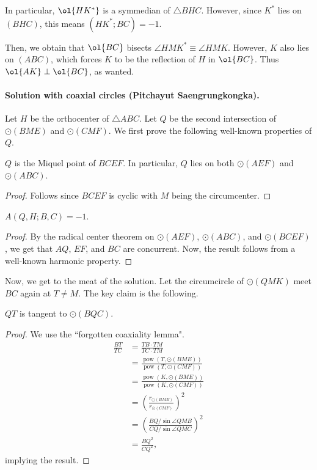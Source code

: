 \documentclass[11pt]{scrartcl}
\begin{document}
In particular, $\ol{HK^\ast}$ is a symmedian of $\triangle BHC$.
However, since $K^\ast$ lies on $(BHC)$,
this means $(HK^\ast; BC) = -1$.

Then, we obtain that $\ol{BC}$ bisects $\angle HMK^\ast \equiv \angle HMK$.
However, $K$ also lies on $(ABC)$,
which forces $K$ to be the reflection of $H$ in $\ol{BC}$.
Thus $\ol{AK} \perp \ol{BC}$, as wanted.

\paragraph{Solution with coaxial circles (Pitchayut Saengrungkongka).}

Let $H$ be the orthocenter of $\triangle ABC$. Let $Q$ be the second intersection of $\odot(BME)$ and $\odot(CMF)$.
We first prove the following well-known properties of $Q$.
\begin{claim*}
$Q$ is the Miquel point of $BCEF$. In particular, $Q$ lies on both $\odot(AEF)$ and $\odot(ABC)$.
\end{claim*}

\begin{proof}
  Follows since $BCEF$ is cyclic with $M$ being the circumcenter.
\end{proof}

\begin{claim*}
  $A(Q,H;B, C) = -1$.
\end{claim*}

\begin{proof}
By the radical center theorem on $\odot(AEF)$, $\odot(ABC)$, and $\odot(BCEF)$,
we get that $AQ$, $EF$, and $BC$ are concurrent. Now, the result follows from a
well-known harmonic property.
\end{proof}

Now, we get to the meat of the solution. Let the circumcircle of
$\odot(QMK)$ meet $BC$ again at $T\neq M$. The key claim is the following.
\begin{claim*}
$QT$ is tangent to $\odot(BQC)$.
\end{claim*}
\begin{proof}
    We use the ``forgotten coaxiality lemma".
    \begin{align*}
	\frac{BT}{TC} &= \frac{TB\cdot TM}{TC\cdot TM} \\
		      &= \frac{\operatorname{pow}(T, \odot(BME))}
		      {\operatorname{pow}(T, \odot(CMF))} \\
		      &= \frac{\operatorname{pow}(K, \odot(BME))}
		      {\operatorname{pow}(K, \odot(CMF))} \\
      &= \left(\frac{r_{\odot(BME)}}{r_{\odot(CMF)}}\right)^2 \\
	&= \left(\frac{BQ/\sin\angle QMB}{CQ/\sin\angle QMC}\right)^2 \\
	&= \frac{BQ^2}{CQ^2},
\end{align*}
implying the result.
\end{proof}
\end{document}
